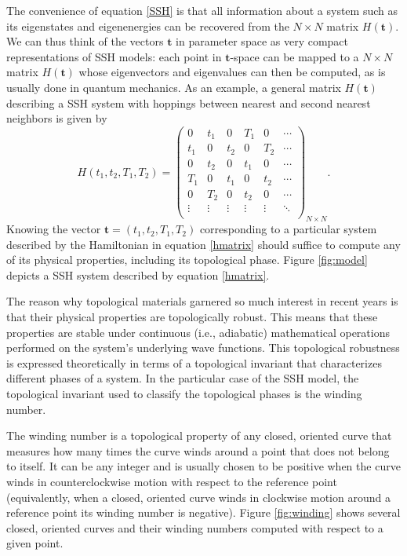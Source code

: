 \documentclass[10pt]{revtex4-1}
\begin{document}
The convenience of equation \eqref{SSH} is that all information about a system such as its eigenstates and eigenenergies can be recovered from the $N\times N$ matrix $H(\mathbf{t})$. We can thus think of the vectors $\mathbf{t}$ in parameter space as very compact representations of SSH models: each point in $\mathbf{t}$-space can be mapped to a $N\times N$ matrix $H(\mathbf{t})$ whose eigenvectors and eigenvalues can then be computed, as is usually done in quantum mechanics. As an example, a general matrix $H(\mathbf{t})$ describing a SSH system with hoppings between nearest and second nearest neighbors is given by
\begin{equation}\label{hmatrix}
H(t_1,t_2,T_1,T_2)=\left(
  \begin{array}{cccccc}
    0 & t_1 & 0 & T_1 & 0 & \cdots \\
    t_1 & 0 & t_2& 0 & T_2 & \cdots\\
    0 & t_2 & 0 & t_1 & 0 & \cdots\\
    T_1 & 0 & t_1 & 0 & t_2 & \cdots\\
    0 & T_2 & 0 & t_2 &  0& \cdots\\
    \vdots & \vdots    & \vdots & \vdots &  \vdots & \ddots\\
  \end{array}
  \right)_{N \times N}.
\end{equation}
Knowing the vector $\mathbf{t}=(t_1,t_2,T_1,T_2)$ corresponding to a particular system described by the Hamiltonian in equation \eqref{hmatrix} should suffice to compute any of its physical properties, including its topological phase. Figure \ref{fig:model} depicts a SSH system described by equation \eqref{hmatrix}.

The reason why topological materials garnered so much interest in recent years is that their physical properties are topologically robust.
This means that these properties are stable under continuous (i.e., adiabatic) mathematical operations performed on the system's underlying wave functions. This topological robustness is expressed theoretically in terms of a topological invariant that characterizes different phases of a system. In the particular case of the SSH model, the topological invariant used to classify the topological phases is the winding number.

The winding number is a topological property of any closed, oriented curve that measures how many times the curve winds around a point that does not belong to itself. It can be any integer and is usually chosen to be positive when the curve winds in counterclockwise motion with respect to the reference point (equivalently, when a closed, oriented curve winds in clockwise motion around a reference point its winding number is negative). Figure \ref{fig:winding} shows several closed, oriented curves and their winding numbers computed with respect to a given point.
\end{document}
